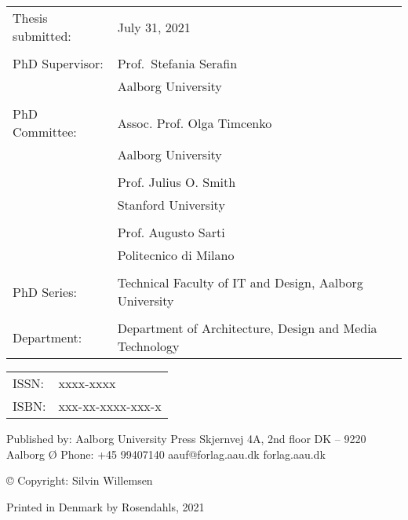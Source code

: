 \thispagestyle{empty}
\noindent
\fontsize{9.5}{12}\selectfont %
\begin{tabularx}{\textwidth}{@{}lX}
    Thesis submitted: & July 31, 2021\\
    \\
    PhD Supervisor: & Prof.\ Stefania Serafin\\
                    & Aalborg University\\
                    \\
    PhD Committee:  & Assoc. Prof. Olga Timcenko\\
                    & Aalborg University\\
                    \\
                    & Prof. Julius O. Smith \\
                    & Stanford University\\
                    \\
                    & Prof. Augusto Sarti\\
                    & Politecnico di Milano\\
                   \\
    PhD Series:    & Technical Faculty of IT and Design, Aalborg University\\
    \\
    Department: & Department of Architecture, Design and Media Technology
\end{tabularx}
\normalsize
\strut\vfill
\noindent
\begin{tabularx}{\textwidth}{@{}lX}
    ISSN: & xxxx-xxxx\\
    ISBN: & xxx-xx-xxxx-xxx-x\\
\end{tabularx}
\strut\vfill
\noindent Published by:\newline
Aalborg University Press\newline
Skjernvej 4A, 2nd floor\newline
DK – 9220 Aalborg Ø\newline
Phone: +45 99407140\newline
aauf@forlag.aau.dk\newline
forlag.aau.dk
\strut\vfill
\noindent \copyright{} Copyright: Silvin Willemsen\newline
\strut\vfill
\noindent Printed in Denmark by Rosendahls, 2021
\clearpage

